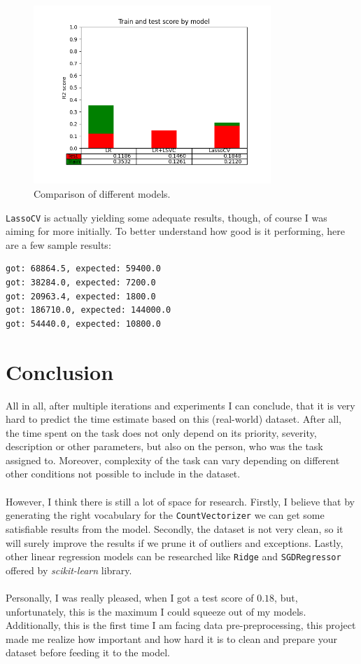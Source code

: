\documentclass{article}
\begin{document}
\begin{figure}[H]
    \centering
    \includegraphics[width=0.8\textwidth]{Figure_4.png}
    \caption{Comparison of different models.
    }\label{fig:Figure_4}
\end{figure}

\lstinline{LassoCV} is actually yielding some adequate results, though, of course I was aiming for more initially.
To better understand how good is it performing, here are a few sample results:
\begin{lstlisting}
got: 68864.5, expected: 59400.0
got: 38284.0, expected: 7200.0
got: 20963.4, expected: 1800.0
got: 186710.0, expected: 144000.0
got: 54440.0, expected: 10800.0
\end{lstlisting}

\section{Conclusion}
All in all, after multiple iterations and experiments I can conclude, that it is very hard to predict the time
estimate based on this (real-world) dataset. After all, the time spent on the task does not only depend on its
priority, severity, description or other parameters, but also on the person, who was the task assigned to. Moreover,
complexity of the task can vary depending on different other conditions not possible to include in the dataset.\\ \\
However, I think there is still a lot of space for research. Firstly, I believe that by generating the right vocabulary
for the \lstinline{CountVectorizer} we can get some satisfiable results from the model. Secondly, the dataset is not
very clean, so it will surely improve the results if we prune it of outliers and exceptions. 
Lastly, other linear regression
models can be researched like \lstinline{Ridge} and \lstinline{SGDRegressor} offered by \textit{scikit-learn} library. \\ \\
Personally, I was really pleased, when I got a test score of $0.18$, but, unfortunately, this is the maximum I could
squeeze out of my models. Additionally, this is the first time I am facing data pre-preprocessing, this project made
me realize how important and how hard it is to clean and prepare your dataset before feeding it to the model.
\end{document}

